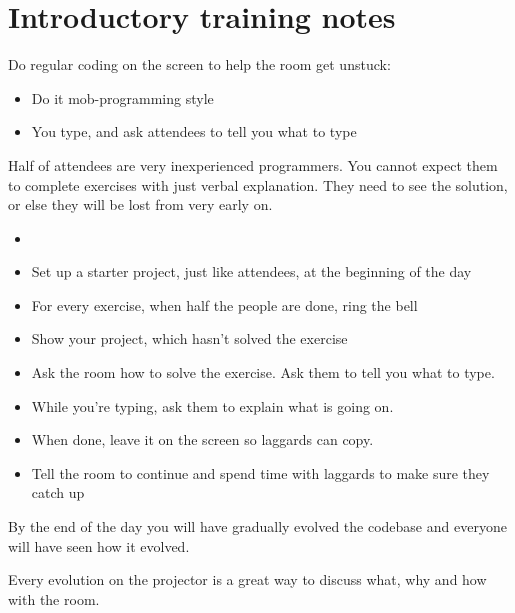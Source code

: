 \ifnotes

    \chapter*{Introductory training notes}

    Do regular coding on the screen to help the room get unstuck:
    
    \begin{itemize}
        \item Do it mob-programming style
        \item You type, and ask attendees to tell you what to type
    \end{itemize}

    Half of attendees are very inexperienced programmers. You cannot expect them to complete exercises with just verbal explanation. They need to see the solution, or else they will be lost from very early on.
    
    \begin{itemize}
        \item 
            \item Set up a starter project, just like attendees, at the beginning of the day
            \item For every exercise, when half the people are done, ring the bell
            \item Show your project, which hasn’t solved the exercise
            \item Ask the room how to solve the exercise. Ask them to tell you what to type.
            \item While you’re typing, ask them to explain what is going on.
            \item When done, leave it on the screen so laggards can copy.
            \item Tell the room to continue and spend time with laggards to make sure they catch up
    \end{itemize}

    By the end of the day you will have gradually evolved the codebase and everyone will have seen how it evolved.
    
    Every evolution on the projector is a great way to discuss what, why and how with the room.
\fi 
